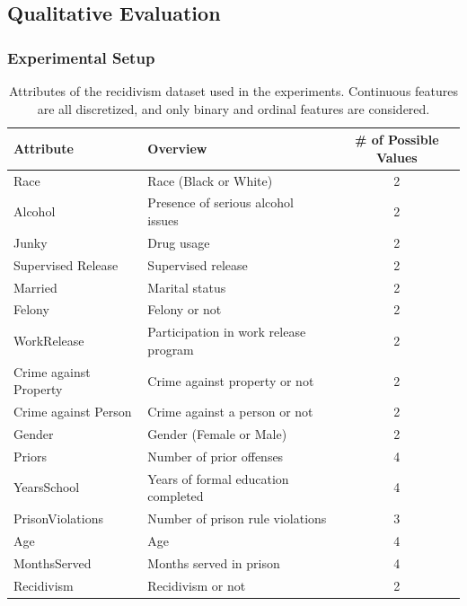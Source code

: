 \documentclass[runningheads]{llncs}
\begin{document}
\subsection{Qualitative Evaluation}
\subsubsection{Experimental Setup}\label{sec:exp-setting}
{%
  \renewcommand{\arraystretch}{1.05}
  \begin{table}[tbp]
    \centering
    \caption[Attributes of the recidivism dataset used in the experiments]{%
      Attributes of the recidivism dataset used in the experiments.
      Continuous features are all discretized,
      and only binary and ordinal features are considered.
    }\label{tab:rcdv}
    \begin{tabular}{llc}
      \toprule
      Attribute              & Overview                              & \# of Possible Values \\
      \midrule
      Race                   & Race (Black or White)                 & 2                     \\
      Alcohol                & Presence of serious alcohol issues    & 2                     \\
      Junky                  & Drug usage                            & 2                     \\
      Supervised Release     & Supervised release                    & 2                     \\
      Married                & Marital status                        & 2                     \\
      Felony                 & Felony or not                         & 2                     \\
      WorkRelease            & Participation in work release program & 2                     \\
      Crime against Property & Crime against property or not         & 2                     \\
      Crime against Person   & Crime against a person or not         & 2                     \\
      Gender                 & Gender (Female or Male)               & 2                     \\
      Priors                 & Number of prior offenses              & 4                     \\
      YearsSchool            & Years of formal education completed   & 4                     \\
      PrisonViolations       & Number of prison rule violations      & 3                     \\
      Age                    & Age                                   & 4                     \\
      MonthsServed           & Months served in prison               & 4                     \\
      \midrule
      Recidivism             & Recidivism or not                     & 2                     \\
      \bottomrule
    \end{tabular}
  \end{table}
}
\end{document}
